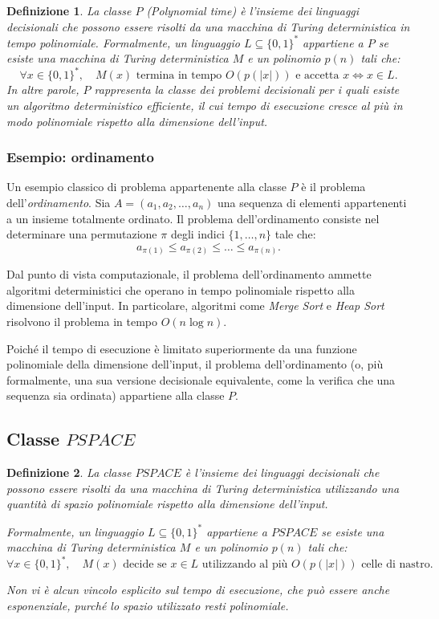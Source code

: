 \documentclass[a4paper,12pt]{report}
\newtheorem{definition}{Definizione}[chapter]
\theoremstyle{propositionstyle}
\begin{document}
    \begin{definition}
        La classe $P$ (Polynomial time) è l'insieme dei linguaggi decisionali che possono essere risolti da una macchina di Turing deterministica in tempo polinomiale.
        Formalmente, un linguaggio $L \subseteq \{0,1\}^*$ appartiene a $P$ se esiste una macchina di Turing deterministica $M$ e un polinomio $p(n)$ tali che:
        \[
            \forall x \in \{0,1\}^*, \quad M(x) \text{ termina in tempo } O(p(|x|)) \text{ e accetta } x \iff x \in L.
        \]
        In altre parole, $P$ rappresenta la classe dei problemi decisionali per i quali esiste un algoritmo deterministico efficiente, il cui tempo di esecuzione cresce al più in modo polinomiale rispetto alla dimensione dell’input.
    \end{definition}

    \subsubsection{Esempio: ordinamento}

    Un esempio classico di problema appartenente alla classe $P$ è il problema dell'\emph{ordinamento}.
    Sia $A = (a_1, a_2, \dots, a_n)$ una sequenza di elementi appartenenti a un insieme totalmente ordinato. Il problema dell'ordinamento consiste nel determinare una permutazione $\pi$ degli indici $\{1, \dots, n\}$ tale che:
    \[
        a_{\pi(1)} \leq a_{\pi(2)} \leq \dots \leq a_{\pi(n)}.
    \]

    Dal punto di vista computazionale, il problema dell'ordinamento ammette algoritmi deterministici che operano in tempo polinomiale rispetto alla dimensione dell'input. In particolare, algoritmi come \emph{Merge Sort} e \emph{Heap Sort} risolvono il problema in tempo $O(n \log n)$.

    Poiché il tempo di esecuzione è limitato superiormente da una funzione polinomiale della dimensione dell'input, il problema dell'ordinamento (o, più formalmente, una sua versione decisionale equivalente, come la verifica che una sequenza sia ordinata) appartiene alla classe $P$.

    \subsection{Classe $PSPACE$}

    \begin{definition}
        La classe $PSPACE$ è l'insieme dei linguaggi decisionali che possono essere risolti da una macchina di Turing deterministica utilizzando una quantità di spazio polinomiale rispetto alla dimensione dell'input.

        Formalmente, un linguaggio $L \subseteq \{0,1\}^*$ appartiene a $PSPACE$ se esiste una macchina di Turing deterministica $M$ e un polinomio $p(n)$ tali che:
        \[
            \forall x \in \{0,1\}^*, \quad M(x) \text{ decide se } x \in L \text{ utilizzando al più } O(p(|x|)) \text{ celle di nastro}.
        \]

        Non vi è alcun vincolo esplicito sul tempo di esecuzione, che può essere anche esponenziale, purché lo spazio utilizzato resti polinomiale.
    \end{definition}
\end{document}
